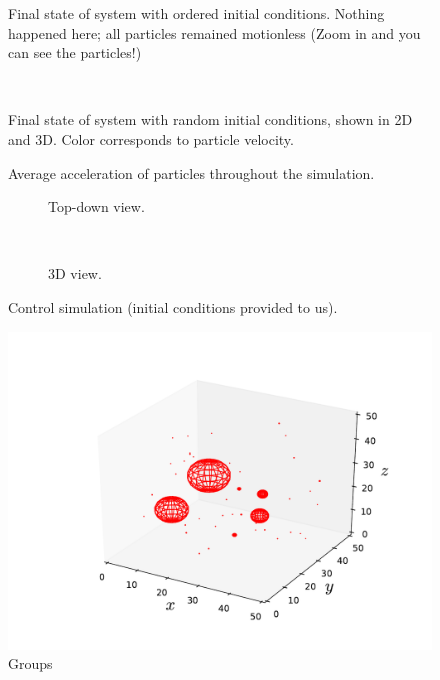 \documentclass[10pt]{article}
\begin{document}
\begin{figure}[htbp]
\centering

\caption{Final state of system with ordered initial conditions. Nothing happened here; all particles remained motionless (Zoom in and you can see the particles!)}
\label{fig:order}
\end{figure}

\begin{figure}[htbp]
\centering
\begin{subfigure}{\textwidth}
\centering

\end{subfigure} \\
\begin{subfigure}{\textwidth}
\centering

\end{subfigure}
\caption{Final state of system with random initial conditions, shown in 2D and 3D. Color corresponds to particle velocity.}
\label{fig:randomic}
\end{figure}

\begin{figure}[htbp]
\centering

\caption{Average acceleration of particles throughout the simulation.}
\label{fig:accel}
\end{figure}


\begin{figure}[htbp]
\centering
\begin{subfigure}{\textwidth}
\centering

\caption{Top-down view.}
\end{subfigure} \\
\begin{subfigure}{\textwidth}
\centering

\caption{3D view.}
\end{subfigure}
\caption{Control simulation (initial conditions provided to us).}
\label{fig:control}
\end{figure}


\begin{figure}[htbp]
\centering
\includegraphics[width=6.2in]{Control_Groups.pdf}
\caption{Groups}
\label{fig:groups}
\end{figure}
\end{document}
